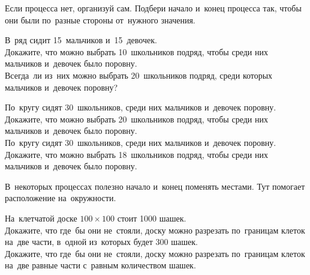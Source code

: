 Если процесса нет, организуй сам.
Подбери начало и~конец процесса так, чтобы они были по~разные стороны
от~нужного значения.

\begin{problems}

\item
В~ряд сидит 15~мальчиков и~15~девочек.
\\
\sp
Докажите, что можно выбрать 10~школьников подряд, чтобы среди них мальчиков
и~девочек было поровну.
\\
\sp
Всегда~ли из~них можно выбрать 20~школьников подряд, среди которых мальчиков
и~девочек поровну?

\item
\sp
По~кругу сидят 30~школьников, среди них мальчиков и~девочек поровну.
Докажите, что можно выбрать 20~школьников подряд, чтобы среди них мальчиков
и~девочек было поровну.
\\
\sp
По~кругу сидят 30~школьников, среди них мальчиков и~девочек поровну.
Докажите, что можно выбрать 18~школьников подряд, чтобы среди них мальчиков
и~девочек было поровну.

\end{problems}

В~некоторых процессах полезно начало и~конец поменять местами.
Тут помогает расположение на~окружности. 

\begin{problems}

\item
На~клетчатой доске $100 \times 100$ стоит 1000 шашек. 
\\
\sp
Докажите, что где~бы они не~стояли, доску можно разрезать по~границам клеток
на~две части, в~одной из~которых будет 300 шашек.
\\
\sp
Докажите, что где~бы они не~стояли, доску можно разрезать по~границам клеток
на~две равные части с~равным количеством шашек.

\end{problems}

